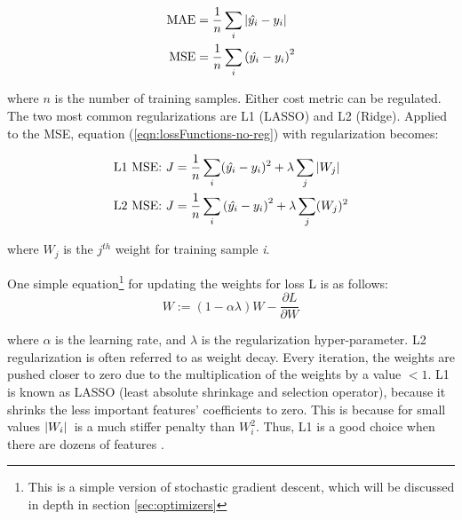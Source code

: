 \begin{align}
    \label{eqn:lossFunctions-no-reg}
    \text{MAE} &= \frac{1}{n} \sum_i \abs*{\hat{y_i} - y_i} \\
    \text{MSE} &= \frac{1}{n} \sum_i \left( \hat{y_i} - y_i \right)^2
\end{align}

\noindent where $ n $ is the number of training samples. Either cost metric can be regulated. The two most common regularizations are L1 (LASSO) and L2 (Ridge). Applied to the MSE, equation (\ref{eqn:lossFunctions-no-reg}) with regularization becomes: 

\begin{align}
    \label{eqn:lossFunctions}
    \text{L1 MSE: } J &= \frac{1}{n} \sum_i (\hat{y_i} - y_i)^2 + \lambda \sum_j \abs*{W_j}\\
    \text{L2 MSE: } J &= \frac{1}{n} \sum_i \left( \hat{y_i} - y_i \right)^2 + \lambda \sum_j (W_j)^2
\end{align}

\noindent where $ W_j $ is the $ j^{th} $ weight for training sample \textit{i}. 

One simple equation\footnote{This is a simple version of stochastic gradient descent, which will be discussed in depth in section \ref{sec:optimizers} } for updating the weights for loss L is as follows:
\begin{equation}
    W := (1-\alpha \lambda)W - \frac{\partial L}{\partial W}  
\end{equation}

\noindent where $\alpha$ is the learning rate, and $\lambda$ is the regularization hyper-parameter. L2 regularization is often referred to as weight decay. Every iteration, the weights are pushed closer to zero due to the multiplication of the weights by a value $<1$. L1 is known as LASSO (least absolute shrinkage and selection operator), because it shrinks the less important features' coefficients to zero. This is because for small values $\abs*{W_i}$ is a much stiffer penalty than $W_i^2$. Thus, L1 is a good choice when there are dozens of features \cite{nn-regularization}. 



